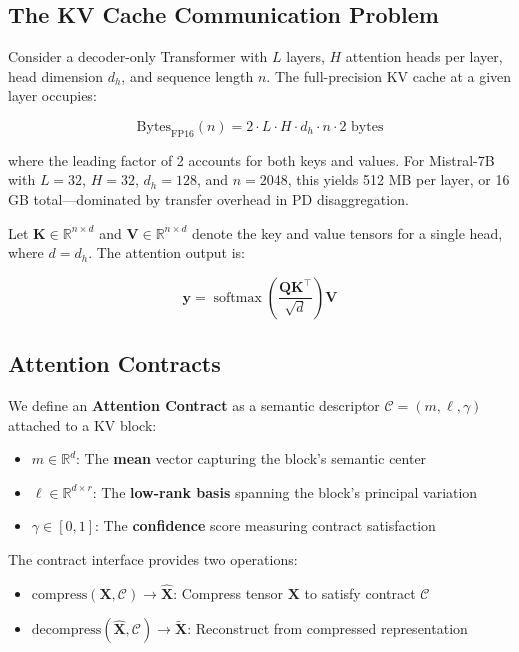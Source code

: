 \documentclass[11pt, a4paper, oneside]{article}
\theoremstyle{myplain}
\theoremstyle{mydefinition}
\theoremstyle{myremark}
\newcommand{\R}{\mathbb{R}}
\DeclareMathOperator{\softmax}{softmax}
\begin{document}
\subsection{The KV Cache Communication Problem}

Consider a decoder-only Transformer with $L$ layers, $H$ attention heads per layer, head dimension $d_h$, and sequence length $n$. The full-precision KV cache at a given layer occupies:

\begin{equation}
    \text{Bytes}_{\text{FP16}}(n) = 2 \cdot L \cdot H \cdot d_h \cdot n \cdot 2 \text{ bytes}
    \label{eq:kv_payload}
\end{equation}

where the leading factor of 2 accounts for both keys and values. For Mistral-7B with $L=32$, $H=32$, $d_h=128$, and $n=2048$, this yields 512 MB per layer, or 16 GB total---dominated by transfer overhead in PD disaggregation.

Let $\mathbf{K} \in \R^{n \times d}$ and $\mathbf{V} \in \R^{n \times d}$ denote the key and value tensors for a single head, where $d = d_h$. The attention output is:

\begin{equation}
    \mathbf{y} = \softmax\left(\frac{\mathbf{Q}\mathbf{K}^\top}{\sqrt{d}}\right) \mathbf{V}
    \label{eq:attention}
\end{equation}

\subsection{Attention Contracts}

We define an \textbf{Attention Contract} as a semantic descriptor $\mathcal{C} = (m, \ell, \gamma)$ attached to a KV block:

\begin{itemize}
    \item $m \in \R^d$: The \textbf{mean} vector capturing the block's semantic center
    \item $\ell \in \R^{d \times r}$: The \textbf{low-rank basis} spanning the block's principal variation
    \item $\gamma \in [0, 1]$: The \textbf{confidence} score measuring contract satisfaction
\end{itemize}

The contract interface provides two operations:

\begin{itemize}
    \item $\text{compress}(\mathbf{X}, \mathcal{C}) \rightarrow \hat{\mathbf{X}}$: Compress tensor $\mathbf{X}$ to satisfy contract $\mathcal{C}$
    \item $\text{decompress}(\hat{\mathbf{X}}, \mathcal{C}) \rightarrow \tilde{\mathbf{X}}$: Reconstruct from compressed representation
\end{itemize}
\end{document}
